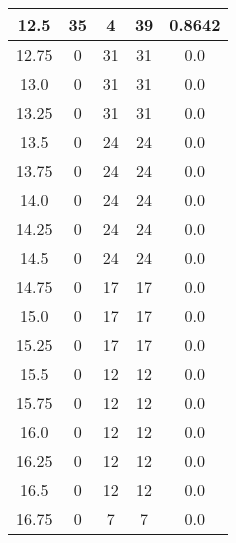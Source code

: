 \documentclass[letterpaper, 12pt]{article}
\begin{document}
\begin{longtable}{|c|c|c|c|c|}
\hline
12.5 & 35 & 4 & 39 & 0.8642 \\
\hline
12.75 & 0 & 31 & 31 & 0.0 \\
\hline
13.0 & 0 & 31 & 31 & 0.0 \\
\hline
13.25 & 0 & 31 & 31 & 0.0 \\
\hline
13.5 & 0 & 24 & 24 & 0.0 \\
\hline
13.75 & 0 & 24 & 24 & 0.0 \\
\hline
14.0 & 0 & 24 & 24 & 0.0 \\
\hline
14.25 & 0 & 24 & 24 & 0.0 \\
\hline
14.5 & 0 & 24 & 24 & 0.0 \\
\hline
14.75 & 0 & 17 & 17 & 0.0 \\
\hline
15.0 & 0 & 17 & 17 & 0.0 \\
\hline
15.25 & 0 & 17 & 17 & 0.0 \\
\hline
15.5 & 0 & 12 & 12 & 0.0 \\
\hline
15.75 & 0 & 12 & 12 & 0.0 \\
\hline
16.0 & 0 & 12 & 12 & 0.0 \\
\hline
16.25 & 0 & 12 & 12 & 0.0 \\
\hline
16.5 & 0 & 12 & 12 & 0.0 \\
\hline
16.75 & 0 & 7 & 7 & 0.0 \\
\hline
\end{longtable}
\end{document}
